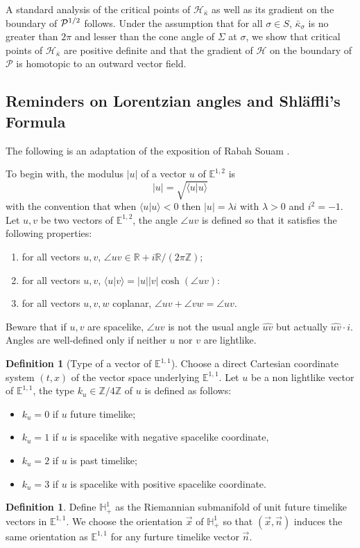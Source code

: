 \documentclass[a4paper,12pt]{article}
\def\ZZ{\mathbb{Z}}
\def\H{\mathbb{H}}
\def\E{\mathbf E}
\def\adm{\P}
\def\E{\mathbb{E}}
\def\RR{\mathbb{R}}
\newcommand{\mass}[1]{{\mathbb E}^{1,2}_{#1}}
\def\E{\mathbb{E}}
\def\adm{\mathcal{P}}
\def\P{\mathcal{P}}
\theoremstyle{definition}
\newtheorem{defi}[lem]{Definition}	%
\begin{document}
				A standard analysis of the critical points of $\mathcal{H}_{\bar\kappa}$ as well as its gradient on the boundary of $\Psq$ follows. Under the assumption that for all $\sigma\in S$, $\bar\kappa_\sigma$ is no greater than $2\pi$ and lesser than the cone angle of $\Sigma$ at $\sigma$, we show that critical points of $\mathcal{H}_{\bar\kappa}$ are positive definite and that the gradient of $\mathcal{H}$ on the boundary of $\adm$ is homotopic to an outward vector field. 
			
				
					
					\subsection{Reminders on Lorentzian angles and Shläffli's Formula}
					The following is an adaptation of the exposition of Rabah Souam \cite{MR2030165}.

					
					To begin with, the modulus $|u|$ of a vector $u$ of $\mass{}$ is
					$$|u|=\sqrt{\langle u|u\rangle}$$
					with the convention that when $\langle u|u\rangle<0$ then $|u|=\lambda i$ with $\lambda>0$ and $i^2=-1$.
					Let $u,v$ be two vectors of $\mass{}$, the angle $\angle uv$ is defined so that it satisfies the following properties:
					\begin{enumerate}
					 \item for all vectors $u,v$, $\angle uv\in \RR+i\RR/(2\pi\ZZ)$;
					 \item for all vectors $u,v$, $\langle u|v\rangle = |u||v|\cosh(\angle uv)$:
					 \item for all vectors $u,v,w$ coplanar, $\angle uv+\angle vw=\angle uv$.
					\end{enumerate}
					Beware that if $u,v$ are spacelike, $\angle uv$ is not the usual angle $\widehat{uv}$ but actually $\widehat{uv}\cdot i$.
					Angles are well-defined only if neither $u$ nor $v$ are lightlike.
					\begin{defi}[Type of a vector of $\E^{1,1}$]
					Choose a direct Cartesian coordinate system $(t,x)$ of the vector space underlying $\E^{1,1}$.
					Let $u$ be a non lightlike vector of $\E^{1,1}$, the type $k_u\in \ZZ/4\ZZ$ of $u$ is defined as follows:
					\begin{itemize}
					 \item $k_u=0$ if $u$ future timelike;
					 \item $k_u=1$ if $u$ is spacelike with negative spacelike coordinate,
					 \item $k_u=2$ if $u$ is past timelike;
					 \item $k_u=3$ if $u$ is spacelike with positive spacelike coordinate.
					\end{itemize}
					\end{defi}
					\begin{defi} Define $\H^1_+$ as the Riemannian submanifold of unit future timelike vectors in $\E^{1,1}$. We choose the orientation $\overrightarrow x$ of  $\H^1_+$ so that $(\overrightarrow x,\overrightarrow n)$ induces the same orientation as $\E^{1,1}$ for any furture timelike vector $\overrightarrow n$. 
					\end{defi}
\end{document}
